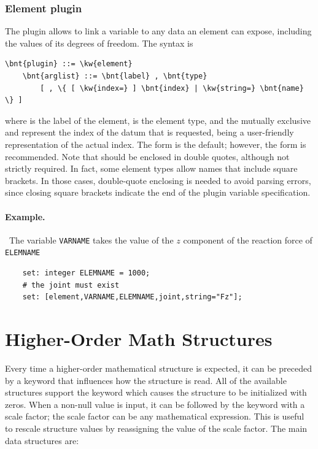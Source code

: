 \subsubsection{Element plugin}
The  plugin allows to link a variable to any data an element
can expose, including the values of its degrees of freedom.
The syntax is
\begin{Verbatim}[commandchars=\\\{\}]
    \bnt{plugin} ::= \kw{element}
    \bnt{arglist} ::= \bnt{label} , \bnt{type}
        [ , \{ [ \kw{index=} ] \bnt{index} | \kw{string=} \bnt{name} \} ]
\end{Verbatim}
where
 is the label of the element,
 is the element type,
and the mutually exclusive  and  represent the index
of the datum that is requested,  being a user-friendly
representation of the actual index.
The  form is the default; however, the  form is recommended.
Note that  should be enclosed in double quotes,
although not strictly required.
In fact, some element types allow names that include square brackets.
In those cases, double-quote enclosing is needed to avoid parsing errors,
since closing square brackets indicate the end
of the plugin variable specification.

\paragraph{Example.} \
The variable \texttt{VARNAME} takes the value of the $z$ component 
of the reaction force of \kw{joint} \texttt{ELEMNAME}
\begin{verbatim}
    set: integer ELEMNAME = 1000;
    # the joint must exist
    set: [element,VARNAME,ELEMNAME,joint,string="Fz"];
\end{verbatim}



\section{Higher-Order Math Structures}
Every time a higher-order mathematical structure is expected, it can be
preceded by a keyword that influences how the structure is read.
All of the available structures support the keyword \kw{null}
which causes the structure to be initialized with zeros.
When a non-null value is input, it can be followed by the keyword
\kw{scale} with a scale factor; the scale factor can be any
mathematical expression.
This is useful to rescale structure values by reassigning the value 
of the scale factor.
The main data structures are:
